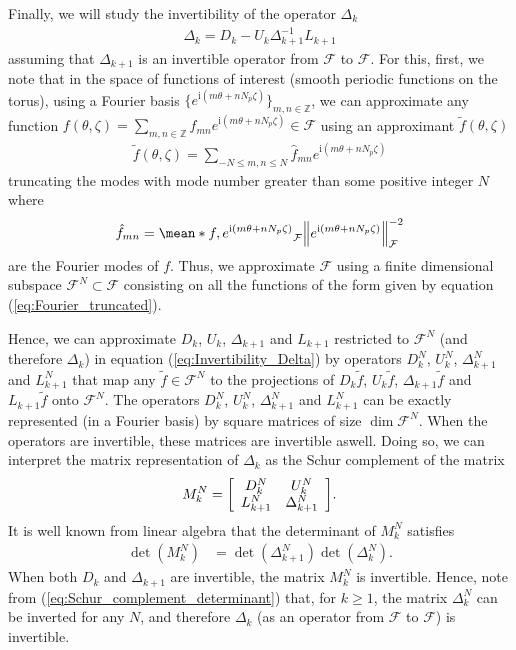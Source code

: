 \documentclass[10pt]{iopart}
\newcommand{\ii}{\text{i}}
\newcommand{\Matrix}[2]
{
	\mleft[
	\begin{array}{#1}
		#2
	\end{array}
	\mright]
}
\begin{document}
Finally, we will study the invertibility of the operator $\Delta_k$ 
%
\begin{align}
	\Delta_{k} = D_k - U_k \Delta_{k+1}^{-1} L_{k+1} 
	\label{eq:Invertibility_Delta}
\end{align}
assuming that $\Delta_{k+1}$ is an invertible operator from $\mathcal{F}$ to $\mathcal{F}$. For this, first, we note that in the space of functions of interest (smooth periodic functions on the torus), using a Fourier basis $\{e^{\ii (m \theta+ nN_p\zeta)}\}_{m,n\in\mathbb{Z}}$, we can approximate any function $f(\theta,\zeta)=\sum_{m,n\in \mathbb{Z}} \hat{f}_{mn} e^{\ii (m \theta+ nN_p\zeta)} \in \mathcal{F}$ using an approximant $\tilde{f}(\theta,\zeta)$
%
\begin{align}
	\tilde{f}(\theta,\zeta)=\sum_{- N \le m,n\le N } \hat{f}_{mn} e^{\ii (m \theta+ nN_p\zeta)}
	\label{eq:Fourier_truncated}
\end{align}
truncating the modes with mode number greater than some positive integer $N $ where 
\begin{align}
	\hat{f}_{mn} = \mean*{f,e^{\ii (m \theta+ nN_p\zeta)}}_{\mathcal{F}}  \norm{e^{\ii (m \theta+ nN_p\zeta)}}_{\mathcal{F}}^{-2}
\end{align}
are the Fourier modes of $f$. Thus, we approximate $\mathcal{F}$ using a finite dimensional subspace $\mathcal{F}^{N} \subset \mathcal{F}$ consisting on all the functions of the form given by equation (\ref{eq:Fourier_truncated}).


Hence, we can approximate $D_k$, $U_k$, $\Delta_{k+1}$ and $L_{k+1} $ restricted to $\mathcal{F}^{N}$ (and therefore $\Delta_{k}$) in equation (\ref{eq:Invertibility_Delta}) by operators $D_k^N$, $U_k^N$, $\Delta_{k+1}^N$ and $L_{k+1}^N$ that map any $\tilde{f}\in\mathcal{F}^N$ to the projections of $D_k \tilde{f}$, $U_k \tilde{f}$, $\Delta_{k+1} \tilde{f}$ and $L_{k+1} \tilde{f}$ onto $\mathcal{F}^N$. The operators $D_k^N$, $U_k^N$, $\Delta_{k+1}^N$ and $L_{k+1}^N$ can be exactly represented (in a Fourier basis) by square matrices of size $\dim \mathcal{F}^N$. When the operators are invertible, these matrices are invertible aswell. Doing so, we can interpret the matrix representation of $\Delta_{k}$ as the Schur complement of the matrix
%
\begin{align}
	M_k^N = 
	\Matrix{cc}
	{ D_k^N & U_k^N \\
		L_{k+1}^N & \Delta_{k+1}^N
	}.
	\label{eq:Invertibility_Delta_Schur}
\end{align}
It is well known from linear algebra that the determinant of $M_k^N$ satisfies
%
\begin{align}
	\det(M_k^N)
	& =
	\det(\Delta_{k+1}^N)
	\det(\Delta_k^N)
	.
	\label{eq:Schur_complement_determinant}
\end{align}
%
When both $D_k$ and $\Delta_{k+1}$ are invertible, the matrix $M_k^N$ is invertible. Hence, note from (\ref{eq:Schur_complement_determinant}) that, for $k\ge1$, the matrix $\Delta_{k}^N$ can be inverted for any $N$, and therefore $\Delta_{k}$ (as an operator from $\mathcal{F}$ to $\mathcal{F}$) is invertible. 
\end{document}
